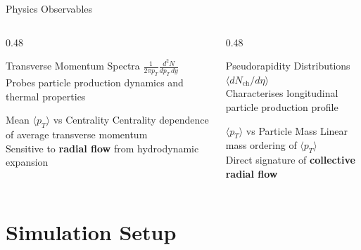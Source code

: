 \documentclass[10pt, aspectratio=169]{beamer}
\begin{document}
\begin{frame}{Physics Observables}

  \begin{columns}
    \begin{column}{0.48\textwidth}
      \begin{block}{Transverse Momentum Spectra}
        $\frac{1}{2\pi p_T}\frac{d^2N}{dp_T\,dy}$\\
        \small Probes particle production dynamics and thermal properties
      \end{block}
      \vspace{0.3cm}
      \begin{block}{Mean $\langle p_T \rangle$ vs Centrality}
        Centrality dependence of average transverse momentum\\
        \small Sensitive to \textbf{radial flow} from hydrodynamic expansion
      \end{block}
    \end{column}
    \begin{column}{0.48\textwidth}
      \begin{block}{Pseudorapidity Distributions}
        $\langle dN_\mathrm{ch}/d\eta \rangle$\\
        \small Characterises longitudinal particle production profile
      \end{block}
      \vspace{0.3cm}
      \begin{block}{$\langle p_T \rangle$ vs Particle Mass}
        Linear mass ordering of $\langle p_T \rangle$\\
        \small Direct signature of \textbf{collective radial flow}
      \end{block}
    \end{column}
  \end{columns}

\end{frame}

\section{Simulation Setup}
\end{document}
